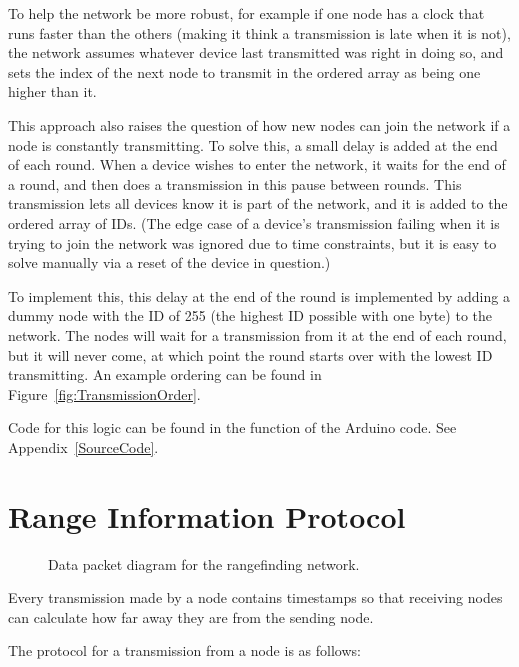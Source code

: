 To help the network be more robust, for example if one node has a clock that runs faster than the others (making it think a transmission is late when it is not), the network assumes whatever device last transmitted was right in doing so, and sets the index of the next node to transmit in the ordered array as being one higher than it.

This approach also raises the question of how new nodes can join the network if a node is constantly transmitting. To solve this, a small delay is added at the end of each round. When a device wishes to enter the network, it waits for the end of a round, and then does a transmission in this pause between rounds. This transmission lets all devices know it is part of the network, and it is added to the ordered array of IDs. (The edge case of a device's transmission failing when it is trying to join the network was ignored due to time constraints, but it is easy to solve manually via a reset of the device in question.)

To implement this, this delay at the end of the round is implemented by adding a dummy node with the ID of 255 (the highest ID possible with one byte) to the network. The nodes will wait for a transmission from it at the end of each round, but it will never come, at which point the round starts over with the lowest ID transmitting. An example ordering can be found in Figure~\ref{fig:TransmissionOrder}.

Code for this logic can be found in the  function of the Arduino code. See Appendix~\ref{SourceCode}.

\section{Range Information Protocol}
\begin{figure}
	\centering
	
	\decoRule
	\caption{Data packet diagram for the rangefinding network.}
	\label{fig:NetworkPacket}
\end{figure}

Every transmission made by a node contains timestamps so that receiving nodes can calculate how far away they are from the sending node.

The protocol for a transmission from a node is as follows:

